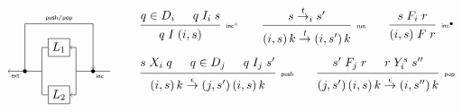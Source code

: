 \documentclass[11pt,oneside]{book}
\theoremstyle{definition}
\newcommand{\kw}[1]{\ensuremath{ \mathsf{#1} }}
\newcommand{\que}{\circ}         %
\newcommand{\ans}{\bullet}       %
\begin{document}
\begin{figure} %
  \[
  \begin{tikzpicture}[xscale=0.5,yscale=0.7,
      baseline=(current bounding box.center)]
    \node[draw] (L1) at (0, 1) {$L_1$};
    \node[draw] (L2) at (0,-1) {$L_2$};
    \begin{scope}[circle, minimum size=3, inner sep=0]
      \node[draw, fill=black] (X) at (-2,0) {};
      \node[draw, fill=black] (I) at (+2,0) {};
    \end{scope}
    \tiny
    \node[below right] at (I) {$\kw{inc}$};
    \draw (L1) -| (-1,0);
    \draw (L2) -| (-1,0) -- (X);
    \draw[->] (X) -- node[below] {$\kw{ext}$} (-3,0);
    \draw[->] (X) |- (0,2) node[above] {$\kw{push}/\kw{pop}$} -| (I);
    \draw (3,0) -- (1,0);
    \draw[->] (1,0) |- (L1);
    \draw[->] (1,0) |- (L2);
  \end{tikzpicture}
  \qquad
    \begin{array}{c}
     {\begin{prooftree}
        \hypo{q \in D_i}
        \hypo{q \mathrel{I_i} s}
        \infer2[\tiny $\kw{inc}^\que$]{q \mathrel{I} (i, s)}
      \end{prooftree}}
      \qquad
     {\begin{prooftree}
        \hypo{s \stackrel{t}{\rightarrow}_i s'}
        \infer1[\tiny $\kw{run}$]{
            (i, s) \, k
            \stackrel{t}{\rightarrow}
            (i, s') \, k}
      \end{prooftree}}
      \qquad
     {\begin{prooftree}
        \hypo{s \mathrel{F_i} r}
        \infer1[\tiny $\kw{inc}^\ans$]{(i, s) \mathrel{F} r}
      \end{prooftree}}
      \vspace{1em}
      \\
     {\begin{prooftree}
        \hypo{s \mathrel{X_i} q}
        \hypo{q \in D_j}
        \hypo{q \mathrel{I_j} s'}
        \infer3[\tiny $\kw{push}$]{
            (i, s) \, k
            \stackrel{\epsilon}{\rightarrow}
            (j, s') \, (i, s) \, k}
      \end{prooftree}}
      \qquad
     {\begin{prooftree}
        \hypo{s' \mathrel{F_j} r}
        \hypo{r \mathrel{Y_i^s} s''}
        \infer2[\tiny $\kw{pop}$]{
            (j, s') \, (i, s) \, k
            \stackrel{\epsilon}{\rightarrow}
            (i, s'') \, k}
      \end{prooftree}}
      \vspace{1em}

\end{array}\]
\end{figure}
\end{document}
